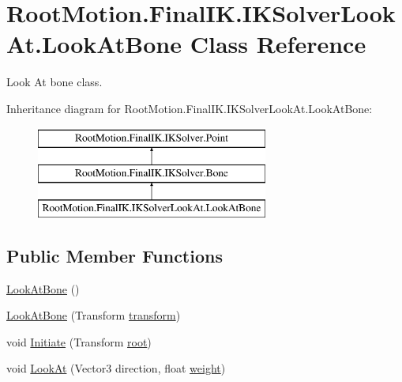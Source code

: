 \hypertarget{class_root_motion_1_1_final_i_k_1_1_i_k_solver_look_at_1_1_look_at_bone}{}\section{Root\+Motion.\+Final\+I\+K.\+I\+K\+Solver\+Look\+At.\+Look\+At\+Bone Class Reference}
\label{class_root_motion_1_1_final_i_k_1_1_i_k_solver_look_at_1_1_look_at_bone}


Look At bone class.  


Inheritance diagram for Root\+Motion.\+Final\+I\+K.\+I\+K\+Solver\+Look\+At.\+Look\+At\+Bone\+:\begin{figure}[H]
\begin{center}
\leavevmode
\includegraphics[height=3.000000cm]{class_root_motion_1_1_final_i_k_1_1_i_k_solver_look_at_1_1_look_at_bone}
\end{center}
\end{figure}
\subsection*{Public Member Functions}
\begin{DoxyCompactItemize}
\item 
\mbox{\hyperlink{class_root_motion_1_1_final_i_k_1_1_i_k_solver_look_at_1_1_look_at_bone_a6b55586e3fc6a2410e14157395707f92}{Look\+At\+Bone}} ()
\item 
\mbox{\hyperlink{class_root_motion_1_1_final_i_k_1_1_i_k_solver_look_at_1_1_look_at_bone_a9ca5b0401e894be8a6928ab890f415b0}{Look\+At\+Bone}} (Transform \mbox{\hyperlink{class_root_motion_1_1_final_i_k_1_1_i_k_solver_1_1_point_a438b0ff2494f43dfe97c2a1578b1ee06}{transform}})
\item 
void \mbox{\hyperlink{class_root_motion_1_1_final_i_k_1_1_i_k_solver_look_at_1_1_look_at_bone_a0e3ea2cc8292cc2c92d841c4001af8c2}{Initiate}} (Transform \mbox{\hyperlink{class_root_motion_1_1_final_i_k_1_1_i_k_solver_add558b38f163259934c37a0f1b497c06}{root}})
\item 
void \mbox{\hyperlink{class_root_motion_1_1_final_i_k_1_1_i_k_solver_look_at_1_1_look_at_bone_aff3c715399ba0dd1d1eb741dcf005c10}{Look\+At}} (Vector3 direction, float \mbox{\hyperlink{class_root_motion_1_1_final_i_k_1_1_i_k_solver_1_1_point_a33184a0e0c8de5a15a1b0fc060f4e4fb}{weight}})
\end{DoxyCompactItemize}
